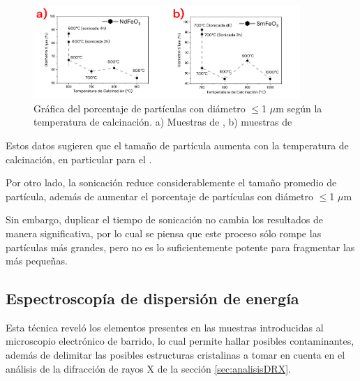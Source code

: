 \documentclass[../main.tex]{subfiles}
\begin{document}
\begin{figure}[H]
    \centering
    \includegraphics[width=0.9\textwidth]{fig/resporcentaje.png}
    \caption{Gráfica del porcentaje de partículas con diámetro $\leq$1 $\mu$m según la temperatura de calcinación. a) Muestras de \neod{}, b) muestras de \sama{}}
    \label{fig:resporcentaje}
\end{figure}
Estos datos sugieren que el tamaño de partícula aumenta con la temperatura de calcinación, en particular para el \neod{}.

Por otro lado, la sonicación reduce considerablemente el tamaño promedio de partícula, además de aumentar el porcentaje de partículas con diámetro $\leq$1 $\mu$m

Sin embargo, duplicar el tiempo de sonicación no cambia los resultados de manera significativa, por lo cual se piensa que este proceso sólo rompe las partículas más grandes, pero no es lo suficientemente potente para fragmentar las más pequeñas.
\subsection{Espectroscopía de dispersión de energía}
Esta técnica reveló los elementos presentes en las muestras introducidas al microscopio electrónico de barrido, lo cual permite hallar posibles contaminantes, además de delimitar las posibles estructuras cristalinas a tomar en cuenta en el análisis de la difracción de rayos X de la sección \ref{sec:analisisDRX}.
\end{document}

